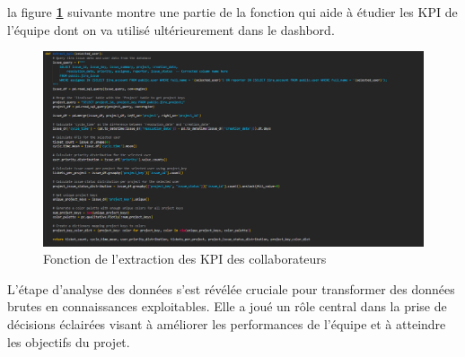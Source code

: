\begin{itemize}
            \par la figure \textbf{\ref{fig:KPI}} suivante montre une partie de la fonction qui aide à étudier les KPI de l'équipe dont on va utilisé ultérieurement dans le dashbord. 
             \begin{figure}[H]
                \centering
                \includegraphics[width=1\linewidth]{img/captures/extractKPI.png}
                \caption{Fonction de l'extraction des KPI des collaborateurs}
                \label{fig:KPI}
            \end{figure}
        \end{itemize}
        \par L'étape d'analyse des données s'est révélée cruciale pour transformer des données brutes en connaissances exploitables. Elle a joué un rôle central dans la prise de décisions éclairées visant à améliorer les performances de l'équipe et à atteindre les objectifs du projet.
